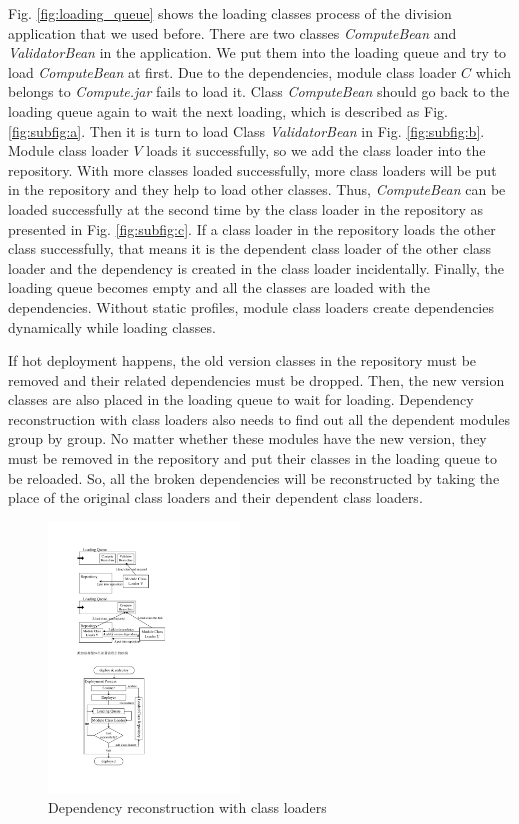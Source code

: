 \documentclass[conference]{IEEEtran}
\begin{document}
Fig. \ref{fig:loading_queue} shows the loading classes process of the division application that we used before. 
There are two classes \emph{ComputeBean} and \emph{ValidatorBean} in the application. 
We put them into the loading queue and try to load \emph{ComputeBean} at first. 
Due to the dependencies, module class loader $C$ which belongs to \emph{Compute.jar} fails to load it. 
Class \emph{ComputeBean} should go back to the loading queue again to wait the next loading, which is described as Fig. \ref{fig:subfig:a}. 
Then it is turn to load Class \emph{ValidatorBean} in Fig. \ref{fig:subfig:b}. 
Module class loader $V$ loads it successfully, so we add the class loader into the repository. 
With more classes loaded successfully, more class loaders will be put in the repository and they help to load other classes. 
Thus, \emph{ComputeBean} can be loaded successfully at the second time by the class loader in the repository as presented in Fig. \ref{fig:subfig:c}.
If a class loader in the repository loads the other class successfully, that means it is the dependent class loader of the other class loader and the dependency is created in the class loader incidentally. 
Finally, the loading queue becomes empty and all the classes are loaded with the dependencies.
Without static profiles, module class loaders create dependencies dynamically while loading classes.

If hot deployment happens, the old version classes in the repository must be removed and their related dependencies must be dropped. 
Then, the new version classes are also placed in the loading queue to wait for loading. 
Dependency reconstruction with class loaders also needs to find out all the dependent modules group by group. 
No matter whether these modules have the new version, they must be removed in the repository and put their classes in the loading queue to be reloaded. 
So, all the broken dependencies will be reconstructed by taking the place of the original class loaders and their dependent class loaders. 

\begin{figure}[ht]
\centering
\includegraphics[width=2.0in]{ProcessReconstructionCL.pdf}
\caption{Dependency reconstruction with class loaders}
\label{fig:reconstruction_CL}
\end{figure}
\end{document}
